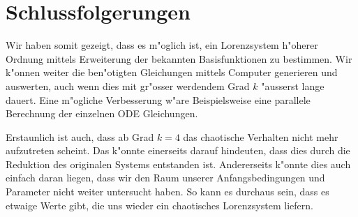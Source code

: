 \section{Schlussfolgerungen}
Wir haben somit gezeigt, dass es m"oglich ist, ein Lorenzsystem h"oherer 
Ordnung 
mittels Erweiterung der bekannten Basisfunktionen zu bestimmen. Wir k"onnen 
weiter die ben"otigten Gleichungen mittels Computer generieren und auswerten, 
auch wenn dies mit gr"osser werdendem Grad $k$ "ausserst lange dauert. Eine 
m"ogliche Verbesserung w"are Beispielsweise eine parallele Berechnung der 
einzelnen ODE Gleichungen.

Erstaunlich ist auch, dass ab Grad $k = 4$ das chaotische Verhalten nicht mehr 
aufzutreten scheint. Das k"onnte einerseits darauf hindeuten, dass dies durch 
die Reduktion des originalen Systems entstanden ist. Andererseits k"onnte dies 
auch einfach daran liegen, dass wir den Raum unserer Anfangsbedingungen und 
Parameter nicht weiter untersucht haben. So kann es durchaus sein, dass es 
etwaige Werte gibt, die uns wieder ein chaotisches Lorenzsystem liefern.
